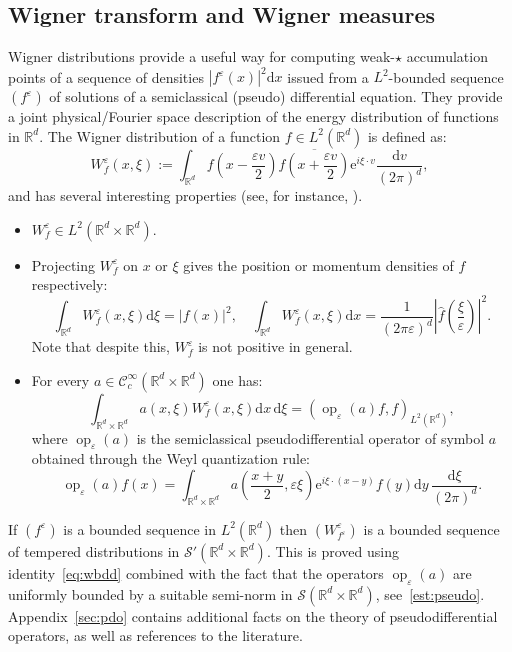 \documentclass[AHL,Unicode,longabstracts]{cedram}
\DeclareMathOperator{\op}{op}
\newcommand*\R{{\mathbb R}}
\newcommand*\eps{\varepsilon}
\numberwithin{equation}{section}
\newcommand{\ee}{{\mathrm e}}
\newcommand*{\dd}{\mathrm{d}}
\newcommand*{\dx}{\dd x}
\newcommand*{\dy}{\dd y}
\newcommand*{\dv}{\dd v}
\newcommand*{\dxi}{\dd \xi}
\begin{document}
\subsection{Wigner transform and Wigner measures} Wigner distributions provide a useful way for computing weak-$\star$ accumulation points of a sequence of densities $|f^\eps(x)|^2\dx$ issued from a $L^2$-bounded sequence~$(f^\eps)$ of solutions of a semiclassical (pseudo) differential equation. They provide a joint physical/Fourier space description of the energy distribution of functions in $\R^d$. The Wigner distribution of a function $f\in L^2(\R^d)$ is defined as:
\[
W^\eps_f(x,\xi):=\int_{\R^d}f\left(x-\frac{\eps v}{2}\right)\overline{f\left(x+\frac{\eps v}{2}\right)}{\ee}^{i\xi\cdot v}\frac{\dv}{(2\pi)^d},
\]
and has several interesting properties (see, for instance, \cite{FollandPhaseSpace}).
\begin{itemize}
\item $W^\eps_f\in L^2(\R^d\times\R^d)$.
\item Projecting $W_f^\eps$ on $x$ or $\xi$ gives the position or momentum densities of $f$ respectively:
\[
\int_{\R^d}W_f^\eps(x,\xi)\dxi=|f(x)|^2,\quad \int_{\R^d}W_f^\eps(x,\xi)\dx=\frac{1}{(2\pi\eps)^d}\left|\widehat{f}\left(\frac{\xi}{\eps}\right)\right|^2.
\]
Note that despite this, $W_f^\eps$ is not positive in general.
\item For every $a\in\mathcal{C}^\infty_c(\R^d\times\R^d)$ one has:
\begin{equation}\label{eq:wbdd}
\int_{\R^d\times\R^d}a(x,\xi)W_f^\eps(x,\xi)\dx\,\dxi=(\op_\eps(a)f,f)_{L^2(\R^d)},
\end{equation}
where $\op_\eps(a)$ is the semiclassical pseudodifferential operator of symbol $a$ obtained through the Weyl quantization rule:
\[
\op_\eps(a) f(x)=\int_{\R^{d}\times\R^d} a\left(\frac{x+y}{2},\eps\xi\right) {\ee}^{i \xi\cdot (x-y)} f(y)\dy\,\frac{\dxi}{(2\pi)^d}.
\]
\end{itemize}

If $(f^\eps)$ is a bounded sequence in $L^2(\R^d)$ then $(W^\eps_{f^\eps})$ is a bounded sequence of tempered distributions in $\mathcal{S}'(\R^d\times\R^d)$. This is proved using identity~\eqref{eq:wbdd} combined with the fact that the operators $\op_\eps(a)$ are uniformly bounded by a suitable semi-norm in $\mathcal{S}(\R^d\times\R^d)$, see~\eqref{est:pseudo}. Appendix~\ref{sec:pdo} contains additional facts on the theory of pseudodifferential operators, as well as references to the literature.
\end{document}

